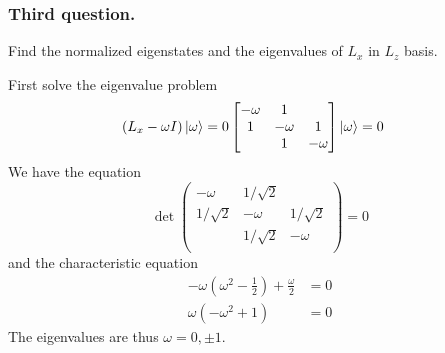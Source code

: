\documentclass[../../../main.tex]{subfiles}
\begin{document}
\subsubsection{Third question.}
Find the normalized eigenstates and the eigenvalues of $L_x$ in $L_z$ basis.

First solve the eigenvalue problem 
\begin{align*}
    \left( L_x-\omega I  \right) \ket{\omega}&= 0
    \begin{bmatrix}
        -\omega & 1& \\
        1&-\omega &1 \\
        & 1&-\omega \\
    \end{bmatrix}
    \ket{\omega}=0
\end{align*}
We have the equation
\begin{equation*}
    \det
    \begin{pmatrix}
        -\omega & 1/\sqrt{2 }& \\
        1/\sqrt{2}&-\omega &1/\sqrt{2} \\
        & 1/\sqrt{2}&-\omega \\
    \end{pmatrix}
    =0
\end{equation*}
and the characteristic equation
\begin{align*}
    -\omega \left( \omega^2- \frac{1 }{2} \right) +\frac{\omega }{2}&= 0\\
    \omega \left( -\omega^2+1  \right) &= 0
\end{align*}
The eigenvalues are thus $\omega=0,\pm 1$.
\end{document}
